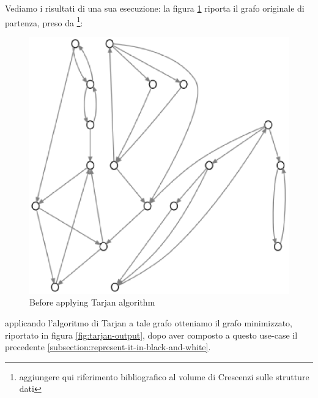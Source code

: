 Vediamo i risultati di una sua esecuzione: la figura
\ref{fig:before-applying-tarjan} riporta il grafo originale di
partenza, preso da \footnote{aggiungere qui riferimento bibliografico
  al volume di Crescenzi sulle strutture dati}:
\begin{figure}
  \centering
  \includegraphics{images/OnePipingLevelUnitTest_Printer_DFS_PrinterPipe_Crescenzi-phase-PrinterPipeFilter-level-0.eps}
  \caption{Before applying Tarjan algorithm}
  \label{fig:before-applying-tarjan}
\end{figure}
applicando l'algoritmo di Tarjan a tale grafo otteniamo il grafo
minimizzato, riportato in figura \ref{fig:tarjan-output}, dopo aver
composto a questo use-case il precedente
\ref{subsection:represent-it-in-black-and-white}.
